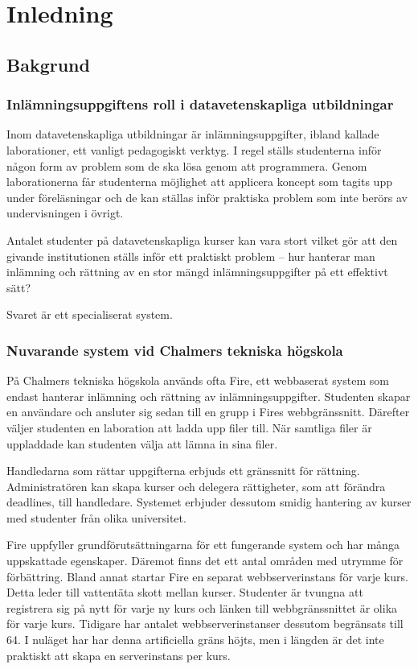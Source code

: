 \chapter{Inledning}

\section{Bakgrund}

\subsection{Inlämningsuppgiftens roll i datavetenskapliga utbildningar}

Inom datavetenskapliga utbildningar är inlämningsuppgifter, ibland kallade laborationer, ett vanligt pedagogiskt verktyg. I regel ställs studenterna inför någon form av problem som de ska lösa genom att programmera. Genom laborationerna får studenterna möjlighet att applicera koncept som tagits upp under föreläsningar och de kan ställas inför praktiska problem som inte berörs av undervisningen i övrigt. 

Antalet studenter på datavetenskapliga kurser kan vara stort vilket gör att den givande institutionen ställs inför ett praktiskt problem – hur hanterar man inlämning och rättning av en stor mängd inlämningsuppgifter på ett effektivt sätt?

Svaret är ett specialiserat system.

\subsection{Nuvarande system vid Chalmers tekniska högskola}

På Chalmers tekniska högskola används ofta Fire, ett webbaserat system som endast hanterar inlämning och rättning av inlämningsuppgifter.
Studenten skapar en användare och ansluter sig sedan till en grupp i Fires webbgränssnitt. Därefter väljer studenten en laboration att ladda upp filer till. När samtliga filer är uppladdade kan studenten välja att lämna in sina filer. 

Handledarna som rättar uppgifterna erbjuds ett gränssnitt för rättning. Administratören kan skapa kurser och delegera rättigheter, som att förändra deadlines, till handledare. Systemet erbjuder dessutom smidig hantering av kurser med studenter från olika universitet.

Fire uppfyller grundförutsättningarna för ett fungerande system och har många uppskattade egenskaper.
Däremot finns det ett antal områden med utrymme för förbättring. Bland annat startar Fire en separat webbserverinstans för varje kurs. Detta leder till vattentäta skott mellan kurser. Studenter är tvungna att registrera sig på nytt för varje ny kurs och länken till webbgränssnittet är olika för varje kurs. Tidigare har antalet webbserverinstanser dessutom begränsats till 64. I nuläget har har denna artificiella gräns höjts, men i längden är det inte praktiskt att skapa en serverinstans per kurs.


